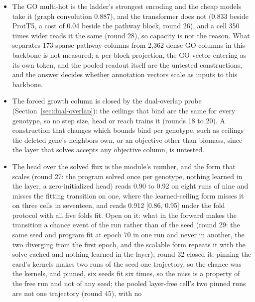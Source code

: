 \begin{itemize}
    graph measures there; a genome-wide set whose nonessential labels come from the
    same source as the essential ones would separate origin from class, and the
    physical graph's own coverage of the deletion collection against the SGD
    inviable set is the first thing to count.
  \item The GO multi-hot is the ladder's strongest encoding and the cheap models take
    it (graph convolution 0.887), and the transformer does not (0.833 beside ProtT5,
    a cost of 0.04 beside the pathway block, round 26), and a cell 350 times wider
    reads it the same (round 28), so capacity is not the reason. What separates 173
    sparse pathway columns from 2,362 dense GO columns in this backbone is not
    measured; a per-block projection, the GO vector entering as its own token, and
    the pooled readout itself are the untested constructions, and the answer decides
    whether annotation vectors scale as inputs to this backbone.
  \item The forced growth column is closed by the dual-overlap probe
    (Section~\ref{sec:dual-overlap}): the ceilings that bind are the same for every
    genotype, so no step size, head or reach trains it (rounds 18 to 20). A construction
    that changes which bounds bind per genotype, such as ceilings the deleted gene's
    neighbors own, or an objective other than biomass, since the layer that solves
    accepts any objective column, is untested.
  \item The head over the solved flux is the module's number, and the form that scales
    (round 27: the program solved once per genotype, nothing learned in the layer, a
    zero-initialized head) reads 0.90 to 0.92 on eight runs of nine and misses the
    fitting transition on one, where the learned-ceiling form misses it on three cells
    in seventeen, and reads 0.912 [0.86, 0.95] under the fold protocol with all five
    folds fit. Open on it: what in the forward makes the transition a chance event of
    the run rather than of the seed (round 29: the same seed and program fit at epoch
    70 in one run and never in another, the two diverging from the first epoch, and
    the scalable form repeats it with the solve cached and nothing learned in the
    layer); round 32 closed it: pinning the card's kernels makes two runs of the seed
    one trajectory, so the chance was the kernels, and pinned, six seeds fit six
    times, so the miss is a property of the free run and not of any seed; the pooled
    layer-free cell's two pinned runs are not one trajectory (round 45), with no

\end{itemize}

